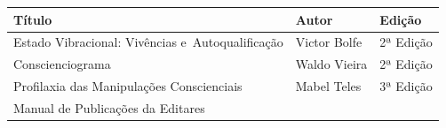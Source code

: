 \documentclass{gescons}
\begin{document}
\begin{longtable}[]{@{}
  >{\raggedright\arraybackslash}p{}
  >{\raggedright\arraybackslash}p{}
  >{\raggedright\arraybackslash}p{}@{}}
  \toprule\noalign{}
\begin{minipage}[t]{\linewidth}\centering
\textbf{Título}
\end{minipage} & \begin{minipage}[t]{\linewidth}\centering
\textbf{Autor}
\end{minipage} & \begin{minipage}[t]{\linewidth}\centering
\textbf{Edição}
\end{minipage} \\
\hline
\begin{minipage}[t]{\linewidth}\raggedright
Estado Vibracional: Vivências e~Autoqualificação
\end{minipage} & \begin{minipage}[t]{\linewidth}\raggedright
Victor Bolfe
\end{minipage} & \begin{minipage}[t]{\linewidth}\centering
2ª Edição
\end{minipage} \\
\hline
\begin{minipage}[t]{\linewidth}\raggedright
Conscienciograma
\end{minipage} & \begin{minipage}[t]{\linewidth}\raggedright
Waldo Vieira
\end{minipage} & \begin{minipage}[t]{\linewidth}\centering
2ª Edição
\end{minipage} \\
\hline
\begin{minipage}[t]{\linewidth}\raggedright
Profilaxia das Manipulações Conscienciais
\end{minipage} & \begin{minipage}[t]{\linewidth}\raggedright
Mabel Teles
\end{minipage} & \begin{minipage}[t]{\linewidth}\centering
3ª Edição
\end{minipage} \\
\hline
\begin{minipage}[t]{\linewidth}\raggedright
Manual de Publicações da Editares

\end{minipage}
\end{longtable}
\end{document}
